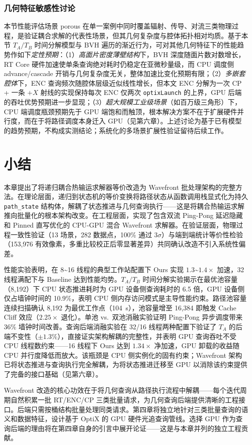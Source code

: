 \subsubsection{几何特征敏感性讨论}

本节性能评估场景 porous 在单一案例中同时覆盖辐射、传导、对流三类物理过程，是验证耦合求解的代表性场景，但其几何复杂度与腔体拓扑相对均质。基于本节 $T_A/T_B$ 时间分解模型与 BVH 遍历的渐近行为，可对其他几何特征下的性能趋势作如下\emph{定性预期}：（1）\emph{高面片密度薄壁结构}下，BVH 深度随面片数对数增长，RT Core 硬件加速使单条查询绝对耗时仍稳定在亚微秒量级，而 CPU 调度侧 advance/cascade 开销与几何复杂度无关，整体加速比变化预期有限；（2）\emph{多嵌套腔体}下，ENC 查询频次随腔体层级近似线性增长，但本文 ENC 分解为一次 CP + 一条 $+X$ 射线的实现保持每次 ENC 仅两次 \texttt{optixLaunch} 的上界，GPU 后端的吞吐优势预期进一步显现；（3）\emph{超大规模工业级场景}（如百万级三角形）下，CPU 端调度瓶颈预期先于 GPU 端饱和而触顶，根本解决方案不在于扩展硬件并行度，而在于将路径调度本身迁入 GPU（见第六章）。上述讨论为基于已有模型的趋势预期，不构成实测结论；系统化的多场景扩展性验证留待后续工作。

\section{小结}

本章提出了将递归耦合热输运求解器等价改造为 Wavefront 批处理架构的完整方法。在理论层面，递归到状态机的等价变换将路径状态从函数调用栈显式化为持久 \texttt{path\_state} 结构体，解耦了状态推进与几何查询执行——这是将耦合热输运求解推向批量化的根本架构改变。在工程层面，实现了包含双流 Ping-Pong 延迟隐藏和 Pinned 直写优化的 CPU-GPU 混合 Wavefront 求解器。在验证层面，物理过程一致性验证（13 场景，282 数据点，100\% 通过 $3\sigma$）与端到端统计等价性检验（153{,}976 有效像素，多重比较校正后零显著差异）共同确认改造不引入系统性偏差。

性能实验表明，在 8\textasciitilde 16 线程的典型工作站配置下 Ours 实现 $1.3$\textasciitilde$1.4\times$ 加速，32 线程满配下与 Baseline 达到性能均势。$T_A/T_B$ 时间分解实验揭示在最优池容量（8{,}192）下 CPU 状态推进耗时为 GPU 设备侧查询耗时的 6.5 倍，GPU 设备侧仅占墙钟时间的 10.9\%，表明 CPU 侧内存访问模式是主导性能约束。路径池容量连续扫描确认 8{,}192 为最优工作点（104~s），池容量增至 16{,}384 即触发 Cache Cliff 效应（$2.25\times$ 退化）。单池 vs.\ 双池消融实验证明 Ping-Pong 异步调度带来 36\% 墙钟时间改善。查询后端消融实验在 32/16 线程两种配置下验证了 $T_A$ 的后端不变性（$\pm 1.3\%$），直接证实架构解耦的完整性，并表明 GPU 查询吞吐不受 CPU 线程数约束——16 线程下 Ours 达到 $1.34\times$ 净加速，GPU 卸载的收益随 CPU 并行度降低而放大。该瓶颈是 CPU 侧实例化的固有约束；Wavefront 架构已将状态推进与查询执行完全解耦，为将状态推进迁移至 GPU 以消除该约束提供了完备的接口基础（见第六章）。

Wavefront 改造的核心功效在于将几何查询从路径执行流程中解耦——每个迭代周期自然积累一批 RT/ENC/CP 三类批量请求，为几何查询后端提供清晰的工程接口。后端只需按桶结构批量处理同类请求。第四章将独立地针对三类批量查询的语义和数据特征，设计基于 OptiX 的 GPU 硬件光追查询管线。选择 GPU 作为查询后端的理由将在第四章自身的引言中展开论证——这是与本章并列的独立工程贡献。

